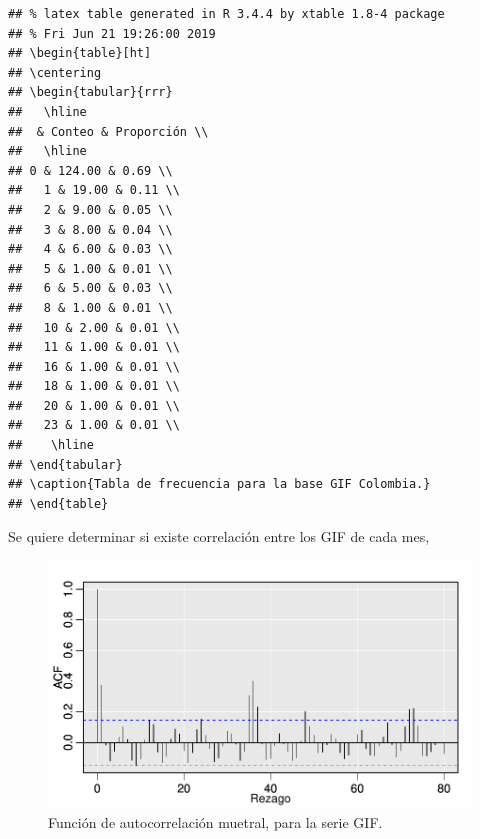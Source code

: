 \documentclass[a4paper]{article}\usepackage[]{graphicx}\usepackage[]{color}
\makeatletter
\def\maxwidth{ %
  \ifdim\Gin@nat@width>\linewidth
    \linewidth
  \else
    \Gin@nat@width
  \fi
}
\newenvironment{kframe}{%
 \def\at@end@of@kframe{}%
 \ifinner\ifhmode%
  \def\at@end@of@kframe{\end{minipage}}%
  \begin{minipage}{\columnwidth}%
 \fi\fi%
 \def\FrameCommand##1{\hskip\@totalleftmargin \hskip-\fboxsep
 \colorbox{shadecolor}{##1}\hskip-\fboxsep
     \hskip-\linewidth \hskip-\@totalleftmargin \hskip\columnwidth}%
 \MakeFramed {\advance\hsize-\width
   \@totalleftmargin\z@ \linewidth\hsize
   \@setminipage}}%
 {\par\unskip\endMakeFramed%
 \at@end@of@kframe}
\newenvironment{knitrout}{}{} %
\makeatother
\begin{document}
\begin{knitrout}
\color{fgcolor}\begin{kframe}
\begin{verbatim}
## % latex table generated in R 3.4.4 by xtable 1.8-4 package
## % Fri Jun 21 19:26:00 2019
## \begin{table}[ht]
## \centering
## \begin{tabular}{rrr}
##   \hline
##  & Conteo & Proporción \\ 
##   \hline
## 0 & 124.00 & 0.69 \\ 
##   1 & 19.00 & 0.11 \\ 
##   2 & 9.00 & 0.05 \\ 
##   3 & 8.00 & 0.04 \\ 
##   4 & 6.00 & 0.03 \\ 
##   5 & 1.00 & 0.01 \\ 
##   6 & 5.00 & 0.03 \\ 
##   8 & 1.00 & 0.01 \\ 
##   10 & 2.00 & 0.01 \\ 
##   11 & 1.00 & 0.01 \\ 
##   16 & 1.00 & 0.01 \\ 
##   18 & 1.00 & 0.01 \\ 
##   20 & 1.00 & 0.01 \\ 
##   23 & 1.00 & 0.01 \\ 
##    \hline
## \end{tabular}
## \caption{Tabla de frecuencia para la base GIF Colombia.} 
## \end{table}
\end{verbatim}
\end{kframe}
\end{knitrout}

Se quiere determinar si existe correlación entre los GIF de cada mes, 

\begin{knitrout}
\color{fgcolor}\begin{figure}
\includegraphics[width=\maxwidth]{figure/unnamed-chunk-38-1} \caption[Función de autocorrelación muetral, para la serie GIF]{Función de autocorrelación muetral, para la serie GIF.}\label{fig:unnamed-chunk-38}
\end{figure}


\end{knitrout}
\end{document}
